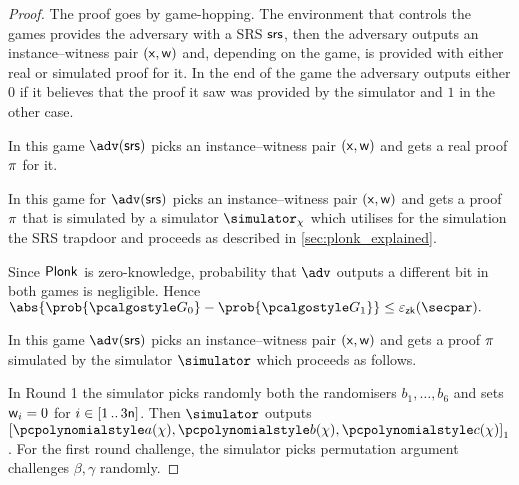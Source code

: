 \begin{proof}
  The proof goes by game-hopping. The environment that controls the games
  provides the adversary with a SRS $\mathsf{srs}$, then the adversary outputs an
  instance--witness pair $(\mathsf{x}, \mathsf{w})$ and, depending on the game, is provided
  with either real or simulated proof for it. In the end of the game the
  adversary outputs either $0$ if it believes that the proof it saw was provided
  by the simulator and $1$ in the other case.

   In this game $\adv(\srs)$ picks an instance--witness pair
  $(\mathsf{x}, \mathsf{w})$ and gets a real proof $\pi$ for it.

   In this game for $\adv(\srs)$ picks an instance--witness pair
  $(\mathsf{x}, \mathsf{w})$ and gets a proof $\pi$ that is simulated by a simulator
  $\simulator_\chi$ which utilises for the simulation the SRS trapdoor and
  proceeds as described in \cref{sec:plonk_explained}.

   Since $\textnormal{\textsf{Plonk}}$ is zero-knowledge,
  probability that $\adv$ outputs a different bit in both games is negligible.
  Hence
  \(
	\abs{\prob{\game{0}} - \prob{\game{1}}} \leq \epszk(\secpar).
\)

 In this game $\adv(\srs)$ picks an instance--witness pair
$(\mathsf{x}, \mathsf{w})$ and gets a proof $\pi$ simulated by the simulator
$\simulator$ which proceeds as follows.

In Round 1 the simulator  picks randomly both the randomisers $b_1, \ldots, b_6$ and
sets $\mathsf{w}_i = 0$ for $i \in [1 \, .. \, 3\mathsf{n}]$. Then $\simulator$
outputs $\gone{\p{a}(\chi), \p{b}(\chi), \p{c}(\chi)}$. For the first round
challenge, the simulator picks permutation argument challenges $\beta, \gamma$
randomly.


\end{proof}
